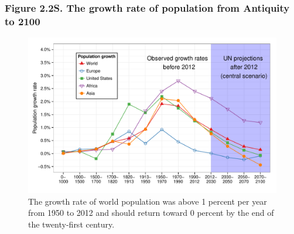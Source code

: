 \documentclass[t]{beamer}\usepackage[]{graphicx}\usepackage[]{color}
\newenvironment{knitrout}{}{} %
\begin{document}
\begin{frame}[label=Figure_2_2S]
\frametitle{Figure 2.2S. The growth rate of population from Antiquity to 2100}
\begin{figure}[t]
\begin{minipage}[b]{\textwidth}
\centering
\begin{knitrout}\footnotesize
{}\color{fgcolor}

{\centering \includegraphics[width=1\linewidth]{figures/color/Figure_2_2S} 

}



\end{knitrout}
\caption{The growth rate of world population was above 1 percent per year from 1950 to 2012 and should return toward 0 percent by the end of the twenty-first century.}
\end{minipage}
\end{figure}
\end{frame}
\end{document}
